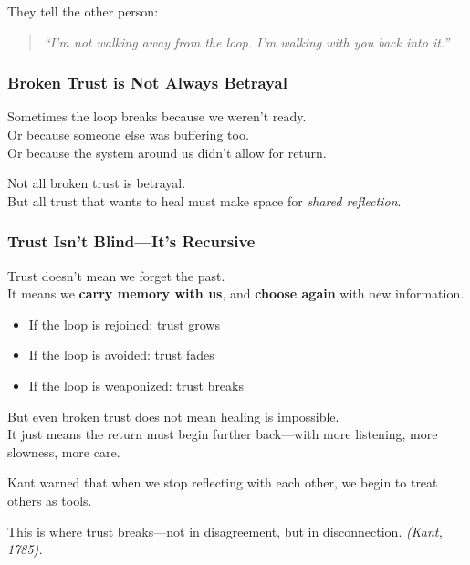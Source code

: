 They tell the other person:

\begin{quote}
\emph{``I'm not walking away from the loop. I'm walking with you back
into it.''}
\end{quote}

\subsubsection{\texorpdfstring{\textbf{Broken Trust is Not Always
Betrayal}}{Broken Trust is Not Always Betrayal}}\label{broken-trust-is-not-always-betrayal}

Sometimes the loop breaks because we weren't ready.\\
Or because someone else was buffering too.\\
Or because the system around us didn't allow for return.

Not all broken trust is betrayal.\\
But all trust that wants to heal must make space for \emph{shared
reflection}.

\subsubsection{\texorpdfstring{\textbf{Trust Isn't Blind---It's
Recursive}}{Trust Isn't Blind---It's Recursive}}\label{trust-isnt-blindits-recursive}

Trust doesn't mean we forget the past.\\
It means we \textbf{carry memory with us}, and \textbf{choose again}
with new information.

\begin{itemize}
\item
  If the loop is rejoined: trust grows
\item
  If the loop is avoided: trust fades
\item
  If the loop is weaponized: trust breaks
\end{itemize}

But even broken trust does not mean healing is impossible.\\
It just means the return must begin further back---with more listening,
more slowness, more care.

Kant warned that when we stop reflecting with each other, we begin to
treat others as tools.

This is where trust breaks---not in disagreement, but in disconnection.
\emph{(Kant, 1785).}

